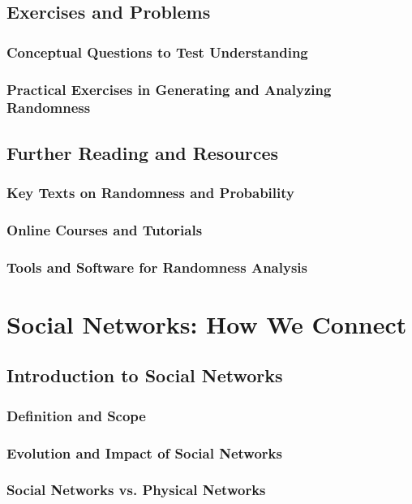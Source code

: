 \documentclass[12pt]{book} %
\begin{document}
\section{Exercises and Problems}
\subsection{Conceptual Questions to Test Understanding}
\subsection{Practical Exercises in Generating and Analyzing Randomness}

\section{Further Reading and Resources}
\subsection{Key Texts on Randomness and Probability}
\subsection{Online Courses and Tutorials}
\subsection{Tools and Software for Randomness Analysis}

\chapter{Social Networks: How We Connect}

\section{Introduction to Social Networks}
\subsection{Definition and Scope}
\subsection{Evolution and Impact of Social Networks}
\subsection{Social Networks vs. Physical Networks}
\end{document}
